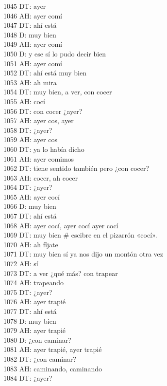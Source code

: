 1045 DT: ayer\\
1046 AH: ayer comí\\
1047 DT: ahí está\\
1048 D: muy bien\\
1049 AH: ayer comí\\
1050 D: y ese sí lo pudo decir bien\\
1051 AH: ayer comí\\
1052 DT: ahí está muy bien\\
1053 AH: ah mira\\
1054 DT: muy bien, a ver, con cocer\\
1055 AH: cocí\\
1056 DT: con cocer ¿ayer?\\
1057 AH: ayer cos, ayer\\
1058 DT: ¿ayer?\\
1059 AH: ayer cos\\
1060 DT: ya lo había dicho\\
1061 AH: ayer comimos\\
1062 DT: tiene sentido también pero ¿con cocer?\\
1063 AH: cocer, ah cocer\\
1064 DT: ¿ayer?\\
1065 AH: ayer cocí\\
1066 D: muy bien\\
1067 DT: ahí está\\
1068 AH: ayer cocí, ayer cocí ayer cocí\\
1069 DT: muy bien \# escibre en el pizarrón «cocí».\\
1070 AH: ah fíjate\\
1071 DT: muy  bien sí ya nos dijo un montón otra vez\\
1072 AH: sí\\
1073 DT: a ver ¿qué más? con trapear\\
1074 AH: trapeando\\
1075 DT: ¿ayer?\\
1076 AH: ayer trapié\\
1077 DT: ahí está\\
1078 D: muy bien\\
1079 AH: ayer trapié\\
1080 D: ¿con caminar?\\
1081 AH: ayer trapié, ayer trapié\\
1082 DT: ¿con caminar?\\
1083 AH: caminando, caminando\\
1084 DT: ¿ayer?\\
